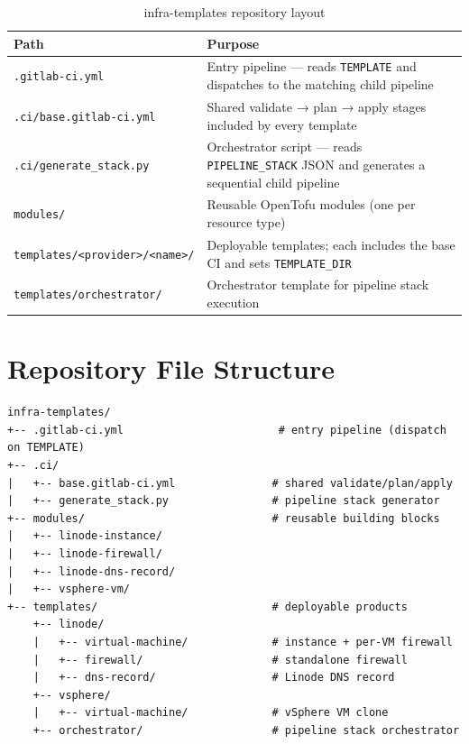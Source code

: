 \documentclass[12pt,a4paper,twoside]{report}
\newcommand{\code}[1]{\texttt{#1}}
\begin{document}
\begin{table}[H]
  \centering
  \caption{infra-templates repository layout}
  \label{tab:repos}
  \begin{tabularx}{\linewidth}{@{}l>{\raggedright\arraybackslash}X@{}}
    \toprule
    \textbf{Path} & \textbf{Purpose} \\
    \midrule
    \code{.gitlab-ci.yml}            & Entry pipeline — reads \code{TEMPLATE} and dispatches to the matching child pipeline \\
    \code{.ci/base.gitlab-ci.yml}    & Shared validate → plan → apply stages included by every template \\
    \code{.ci/generate\_stack.py}    & Orchestrator script — reads \code{PIPELINE\_STACK} JSON and generates a sequential child pipeline \\
    \code{modules/}                  & Reusable OpenTofu modules (one per resource type) \\
    \code{templates/<provider>/<name>/} & Deployable templates; each includes the base CI and sets \code{TEMPLATE\_DIR} \\
    \code{templates/orchestrator/}   & Orchestrator template for pipeline stack execution \\
    \bottomrule
  \end{tabularx}
\end{table}

\section{Repository File Structure}

\begin{lstlisting}[style=bash]
infra-templates/
+-- .gitlab-ci.yml                        # entry pipeline (dispatch on TEMPLATE)
+-- .ci/
|   +-- base.gitlab-ci.yml               # shared validate/plan/apply
|   +-- generate_stack.py                # pipeline stack generator
+-- modules/                             # reusable building blocks
|   +-- linode-instance/
|   +-- linode-firewall/
|   +-- linode-dns-record/
|   +-- vsphere-vm/
+-- templates/                           # deployable products
    +-- linode/
    |   +-- virtual-machine/             # instance + per-VM firewall
    |   +-- firewall/                    # standalone firewall
    |   +-- dns-record/                  # Linode DNS record
    +-- vsphere/
    |   +-- virtual-machine/             # vSphere VM clone
    +-- orchestrator/                    # pipeline stack orchestrator
\end{lstlisting}
\end{document}
